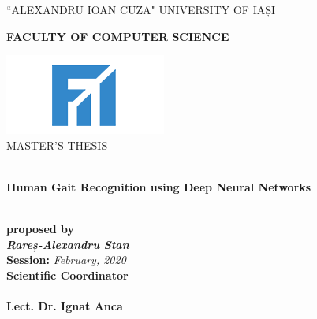 \documentclass[12pt]{article}
\theoremstyle{definition}
\begin{document}
	\begin{titlepage}
		\begin{center}
			\vspace{1cm}
			``ALEXANDRU IOAN CUZA" UNIVERSITY OF IAȘI
			\
			\\
			\begin{large}
				\textbf{FACULTY OF COMPUTER SCIENCE}\\
			\end{large}
			\vspace{2.5cm}
			\includegraphics{fii.png}
			\
			\\
			\vspace{1cm}
			MASTER'S THESIS
			\begin{large}
				\
				\\
				\vspace{1.5cm}
				\textbf{Human Gait Recognition using Deep Neural Networks}
			\end{large}
			\\
			\vspace{1.5cm}
			\textbf{proposed by}
			\\
			\vspace{1.5cm}
			\textit{\textbf{Rareș-Alexandru Stan}}
			\\
			\vspace{2cm}
			\textbf{Session:} \textit{February, 2020}
			\\
			\vspace{1.5cm}
			\textbf{Scientific Coordinator}
			\
			\\
			\
			\\
			\textbf{Lect. Dr. Ignat Anca}

		\end{center}
	\end{titlepage}
	\clearpage
\end{document}

